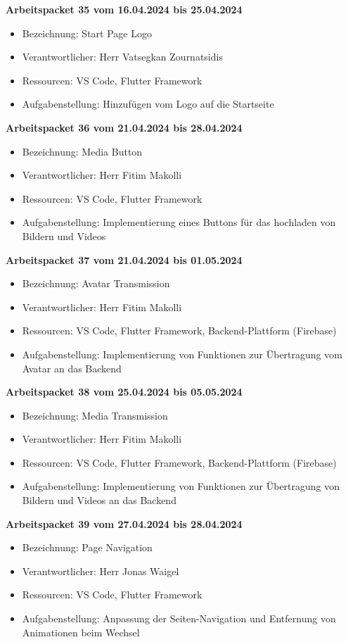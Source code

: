 \textbf{Arbeitspacket 35 vom 16.04.2024 bis 25.04.2024}
\begin{itemize}[itemsep=0pt]
    \item{Bezeichnung: Start Page Logo} 
	\item{Verantwortlicher: Herr Vatsegkan Zournatsidis} 
	\item{Ressourcen: VS Code, Flutter Framework} 
    \item{Aufgabenstellung: Hinzufügen vom Logo auf die Startseite}
\end{itemize}

\textbf{Arbeitspacket 36 vom 21.04.2024 bis 28.04.2024}
\begin{itemize}[itemsep=0pt]
    \item{Bezeichnung: Media Button} 
	\item{Verantwortlicher: Herr Fitim Makolli} 
	\item{Ressourcen: VS Code, Flutter Framework} 
    \item{Aufgabenstellung: Implementierung eines Buttons für das hochladen von Bildern und Videos}
\end{itemize}

\textbf{Arbeitspacket 37 vom 21.04.2024 bis 01.05.2024}
\begin{itemize}[itemsep=0pt]
    \item{Bezeichnung: Avatar Transmission} 
	\item{Verantwortlicher: Herr Fitim Makolli} 
	\item{Ressourcen: VS Code, Flutter Framework, Backend-Plattform (Firebase)}
    \item{Aufgabenstellung: Implementierung von Funktionen zur Übertragung vom Avatar an das Backend} 
\end{itemize} 

\textbf{Arbeitspacket 38 vom 25.04.2024 bis 05.05.2024}
\begin{itemize}[itemsep=0pt]
    \item{Bezeichnung: Media Transmission} 
	\item{Verantwortlicher: Herr Fitim Makolli} 
	\item{Ressourcen: VS Code, Flutter Framework, Backend-Plattform (Firebase)}
    \item{Aufgabenstellung: Implementierung von Funktionen zur Übertragung von Bildern und Videos an das Backend} 
\end{itemize}


\textbf{Arbeitspacket 39 vom 27.04.2024 bis 28.04.2024}
\begin{itemize}[itemsep=0pt]
    \item{Bezeichnung: Page Navigation} 
	\item{Verantwortlicher: Herr Jonas Waigel} 
	\item{Ressourcen: VS Code, Flutter Framework} 
    \item{Aufgabenstellung: Anpassung der Seiten-Navigation und Entfernung von Animationen beim Wechsel}
\end{itemize}

